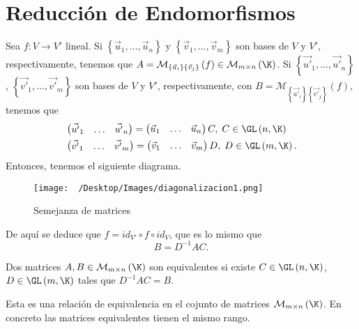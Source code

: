 \chapter{Reducción de Endomorfismos}
Sea $\displaystyle f : V \to V' $ lineal. Si $\displaystyle \left\{ \vec{u}_{1}, \ldots, \vec{u}_{n}\right\}  $ y $\displaystyle \left\{ \vec{v}_{1}, \ldots, \vec{v}_{m}\right\}  $ son bases de $\displaystyle V $ y $\displaystyle V' $, respectivamente, tenemos que $\displaystyle A =\mathcal{M}_{ \left\{ \vec{u}_{i}\right\} \left\{ \vec{v}_{j}\right\} }\left(f\right) \in \mathcal{M}_{m \times n} \left(\K\right) $. Si $\displaystyle \left\{ \vec{u'}_{1}, \ldots, \vec{u'}_{n}\right\}  $, $\displaystyle \left\{ \vec{v'}_{1}, \ldots, \vec{v'}_{m}\right\}  $ son bases de $\displaystyle V $ y $\displaystyle V' $, respectivamente, con $\displaystyle B =\mathcal{M}_{ \left\{ \vec{u'}_{i}\right\} \left\{ \vec{v'}_{j}\right\} }\left(f\right) $, tenemos que
\[
\begin{split}
	& \begin{pmatrix} \vec{u'}_{1} & \ldots & \vec{u'}_{n} \end{pmatrix} = \begin{pmatrix} \vec{u}_{1} & \ldots & \vec{u}_{n} \end{pmatrix} C, \; C \in \GL\left(n, \K\right) \\
	& \begin{pmatrix} \vec{v'}_{1} & \ldots & \vec{v'}_{m} \end{pmatrix} = \begin{pmatrix} \vec{v}_{1} & \ldots & \vec{v}_{m} \end{pmatrix} D, \; D \in \GL\left(m, \K\right).
\end{split}
\]
Entonces, tenemos el siguiente diagrama. 
\begin{figure}
\centering
\texttt{[image: ~/Desktop/Images/diagonalizacion1.png]}
\caption{Semejanza de matrices}
\label{ }
\end{figure}
De aquí se deduce que $\displaystyle f = id _{V'} \circ f \circ id _{V} $, que es lo mismo que
\[B = D^{-1}AC .\]
\begin{fdefinition}[]
	\normalfont Dos matrices $\displaystyle A,B \in \mathcal{M}_{m \times n}\left(\K\right) $ son equivalentes si existe $\displaystyle C \in \GL\left(n, \K\right) $, $\displaystyle D \in \GL\left(m, \K\right) $ tales que $\displaystyle D^{-1}AC = B $.
\end{fdefinition}

\begin{observation}
\normalfont Esta es una relación de equivalencia en el cojunto de matrices $\displaystyle \mathcal{M}_{m \times n}\left(\K\right) $. En concreto las matrices equivalentes tienen el mismo rango.
\end{observation}

